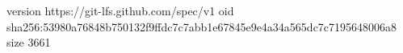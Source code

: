 version https://git-lfs.github.com/spec/v1
oid sha256:53980a76848b750132f9ffdc7c7abb1e67845e9e4a34a565dc7c7195648006a8
size 3661
